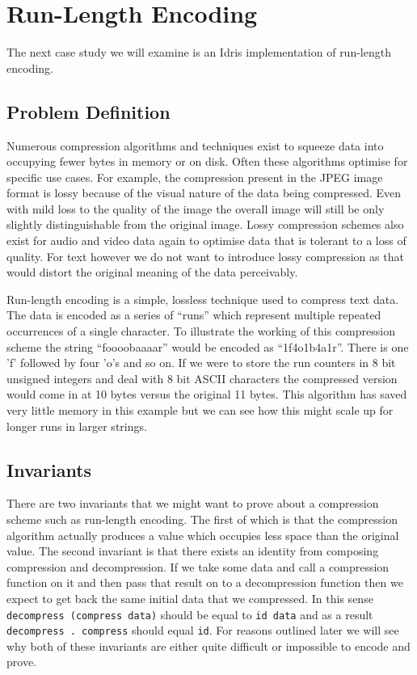 \documentclass[a4paper, notitlepage]{report}
\begin{document}
\section{Run-Length Encoding}
\label{sec:orga5f6751}
The next case study we will examine is an Idris implementation of run-length
encoding.

\subsection{Problem Definition}
\label{sec:orgdbf8269}
Numerous compression algorithms and techniques exist to squeeze data into
occupying fewer bytes in memory or on disk. Often these algorithms optimise for
specific use cases. For example, the compression present in the JPEG image
format is lossy because of the visual nature of the data being compressed. Even
with mild loss to the quality of the image the overall image will still be only
slightly distinguishable from the original image. Lossy compression schemes also
exist for audio and video data again to optimise data that is tolerant to a loss
of quality. For text however we do not want to introduce lossy compression as
that would distort the original meaning of the data perceivably.

Run-length encoding is a simple, lossless technique used to compress text data.
The data is encoded as a series of ``runs'' which represent multiple repeated
occurrences of a single character. To illustrate the working of this compression
scheme the string ``foooobaaaar'' would be encoded as ``1f4o1b4a1r''. There is
one 'f' followed by four 'o's and so on. If we were to store the run counters in
8 bit unsigned integers and deal with 8 bit ASCII characters the compressed
version would come in at 10 bytes versus the original 11 bytes. This algorithm
has saved very little memory in this example but we can see how this might scale
up for longer runs in larger strings.

\subsection{Invariants}
\label{sec:orgd30f265}
There are two invariants that we might want to prove about a compression scheme
such as run-length encoding. The first of which is that the compression
algorithm actually produces a value which occupies less space than the original
value. The second invariant is that there exists an identity from composing
compression and decompression. If we take some data and call a compression
function on it and then pass that result on to a decompression function then we
expect to get back the same initial data that we compressed. In this sense
\texttt{decompress (compress data)} should be equal to \texttt{id data} and as a result \texttt{decompress
. compress} should equal \texttt{id}. For reasons outlined later we will see why both of
these invariants are either quite difficult or impossible to encode and prove.
\end{document}
